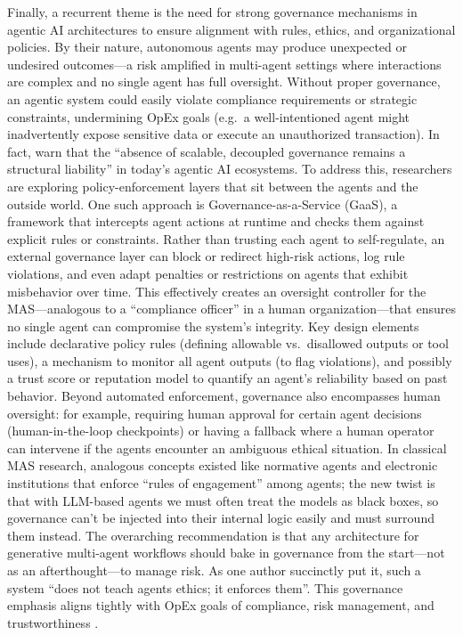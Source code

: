 Finally, a recurrent theme is the need for strong governance mechanisms in agentic AI architectures to ensure alignment with rules, ethics, and organizational policies. By their nature, autonomous agents may produce unexpected or undesired outcomes—a risk amplified in multi-agent settings where interactions are complex and no single agent has full oversight. Without proper governance, an agentic system could easily violate compliance requirements or strategic constraints, undermining OpEx goals (e.g.~a well-intentioned agent might inadvertently expose sensitive data or execute an unauthorized transaction). In fact, \textcite{gauravGovernance2025} warn that the \enquote{absence of scalable, decoupled governance remains a structural liability} in today's agentic AI ecosystems. To address this, researchers are exploring policy-enforcement layers that sit between the agents and the outside world. One such approach is Governance-as-a-Service (GaaS), a framework that intercepts agent actions at runtime and checks them against explicit rules or constraints. Rather than trusting each agent to self-regulate, an external governance layer can block or redirect high-risk actions, log rule violations, and even adapt penalties or restrictions on agents that exhibit misbehavior over time. This effectively creates an oversight controller for the MAS—analogous to a \enquote{compliance officer} in a human organization—that ensures no single agent can compromise the system's integrity. Key design elements include declarative policy rules (defining allowable vs.~disallowed outputs or tool uses), a mechanism to monitor all agent outputs (to flag violations), and possibly a trust score or reputation model to quantify an agent's reliability based on past behavior. Beyond automated enforcement, governance also encompasses human oversight: for example, requiring human approval for certain agent decisions (human-in-the-loop checkpoints) or having a fallback where a human operator can intervene if the agents encounter an ambiguous ethical situation. In classical MAS research, analogous concepts existed like normative agents and electronic institutions that enforce “rules of engagement” among agents; the new twist is that with LLM-based agents we must often treat the models as black boxes, so governance can't be injected into their internal logic easily and must surround them instead. The overarching recommendation is that any architecture for generative multi-agent workflows should bake in governance from the start—not as an afterthought—to manage risk. As one author succinctly put it, such a system “does not teach agents ethics; it enforces them”. This governance emphasis aligns tightly with OpEx goals of compliance, risk management, and trustworthiness \parencite{gauravGovernance2025}.

